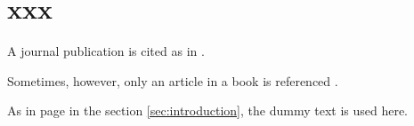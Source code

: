 \section{xxx}

A journal publication is cited as in \cite{someAuthor2013}.

Sometimes, however, only an article in a book is referenced \cite{Faltings2000}.

As in page \pageref{sec:introduction} in the section \ref{sec:introduction}, the dummy text is used here.



\blindtext
